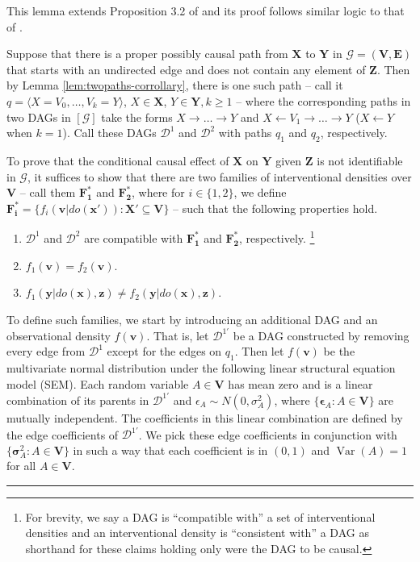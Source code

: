 \documentclass[twoside]{article}
\DeclareMathOperator{\Var}{Var}
\newcommand{\mb}[1]{\mathbf{#1}}
\newcommand{\g}[1][G]{\mathcal{#1}}
\newenvironment{proofof}[1][]{\begin{trivlist}
\item[\hskip \labelsep {\bfseries Proof of #1.}]}{\hfill\BlackBox\end{trivlist}}
\newcommand{\BlackBox}{\rule{1.5ex}{1.5ex}}
\begin{document}
\begin{proofof}[Proposition \ref{prop:id-necessary}]
    This lemma extends Proposition 3.2 of \cite{perkovic2020identifying} and its proof follows similar logic to that of \cite{perkovic2020identifying}.
    
    Suppose that there is a proper possibly causal path from $\mb{X}$ to $\mb{Y}$ in $\g = (\mb{V},\mb{E})$  that starts with an undirected edge and does not contain any element of $\mb{Z}$. Then by Lemma \ref{lem:twopaths-corrollary}, there is one such path -- call it $q=\langle X=V_0, \dots, V_k=Y\rangle$, $X \in \mb{X}$, $Y \in \mb{Y}, k \ge 1$ -- where the corresponding paths in two DAGs in $[\g]$ take the forms $X \to \dots \to Y$ and $X \gets V_1 \to \dots \to Y$ ($X \gets Y$ when $k=1$). Call these DAGs $\g[D]^1$ and $\g[D]^2$ with paths $q_1$ and $q_2$, respectively.

    To prove that the conditional causal effect of $\mb{X}$ on $\mb{Y}$ given $\mb{Z}$ is not identifiable in $\g$, it suffices to show that there are two families of interventional densities over $\mb{V}$ -- call them $\mb{F^*_1}$ and $\mb{F^*_2}$, where for $i \in \{1,2\}$, we define $\mb{F^*_i} = \{ f_i(\mb{v}|do(\mb{x'})) : \mb{X'} \subseteq \mb{V} \}$ -- such that the following properties hold. 
    \begin{enumerate}[label=(\roman*)]
        \item $\g[D]^1$ and $\g[D]^2$ are compatible with $\mb{F^*_1}$ and $\mb{F^*_2}$, respectively.
            \footnote{For brevity, we say a DAG is ``compatible with'' a set of interventional densities and an interventional density is ``consistent with'' a DAG as shorthand for these claims holding only were the DAG to be causal.}
            \label{prop:id-necessary-1}
        \item $f_1(\mb{v}) = f_2(\mb{v})$. \label{prop:id-necessary-2}
        \item $f_1(\mb{y} | do(\mb{x}), \mb{z}) \neq f_2(\mb{y} | do(\mb{x}), \mb{z})$. \label{prop:id-necessary-3}
    \end{enumerate}

    To define such families, we start by introducing an additional DAG and an observational density $f(\mb{v})$. That is, let $\g[D]^{1'}$ be a DAG constructed by removing every edge from $\g[D]^1$ except for the edges on $q_1$. Then let $f(\mb{v})$ be the multivariate normal distribution under the following linear structural equation model (SEM). Each random variable $A \in \mb{V}$ has mean zero and is a linear combination of its parents in $\g[D]^{1'}$ and $\epsilon_{A} \sim N(0, \sigma^2_A)$, where $\{\mb{\epsilon}_{A}: A \in \mb{V}\}$ are mutually independent. The coefficients in this linear combination are defined by the edge coefficients of $\g[D]^{1'}$. We pick these edge coefficients in conjunction with $\{\mb{\sigma}^2_{A}: A \in \mb{V}\}$ in such a way that each coefficient is in $(0,1)$ and $\Var(A) = 1$ for all $A \in \mb{V}$.


\end{proofof}
\end{document}

